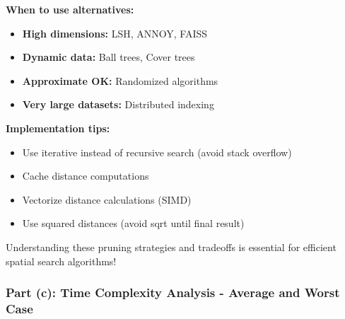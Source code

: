 \documentclass[12pt]{article}
\begin{document}
\begin{explanation}
\textbf{When to use alternatives:}
\begin{itemize}
    \item \textbf{High dimensions:} LSH, ANNOY, FAISS
    \item \textbf{Dynamic data:} Ball trees, Cover trees
    \item \textbf{Approximate OK:} Randomized algorithms
    \item \textbf{Very large datasets:} Distributed indexing
\end{itemize}

\textbf{Implementation tips:}
\begin{itemize}
    \item Use iterative instead of recursive search (avoid stack overflow)
    \item Cache distance computations
    \item Vectorize distance calculations (SIMD)
    \item Use squared distances (avoid sqrt until final result)
\end{itemize}

Understanding these pruning strategies and tradeoffs is essential for efficient spatial search algorithms!
\end{explanation}

\newpage
\subsubsection{Part (c): Time Complexity Analysis - Average and Worst Case}
\end{document}
